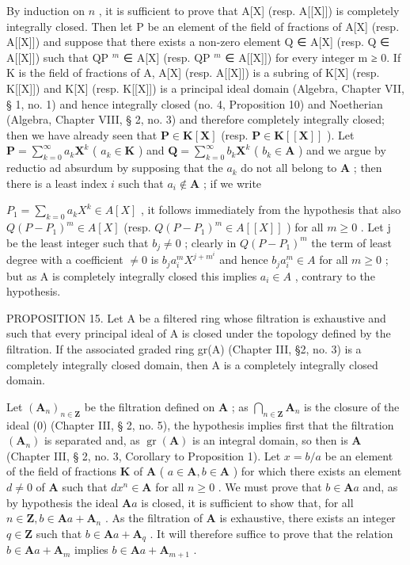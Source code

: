 By induction on \(n\) , it is sufficient to prove that A{[}X{]} (resp. A{[}{[}X{]}{]}) is completely integrally closed. Then let P be an element of the field of fractions of A{[}X{]} (resp. A{[}{[}X{]}{]}) and suppose that there exists a non-zero element Q ∈ A{[}X{]} (resp. Q ∈ A{[}{[}X{]}{]}) such that QP \(^{m}\) ∈ A{[}X{]} (resp. QP \(^{m}\) ∈ A{[}{[}X{]}{]}) for every integer m ≥ 0. If K is the field of fractions of A, A{[}X{]} (resp. A{[}{[}X{]}{]}) is a subring of K{[}X{]} (resp. K{[}{[}X{]}{]}) and K{[}X{]} (resp. K{[}{[}X{]}{]}) is a principal ideal domain (Algebra, Chapter VII, § 1, no. 1) and hence integrally closed (no. 4, Proposition 10) and Noetherian (Algebra, Chapter VIII, § 2, no. 3) and therefore completely integrally closed; then we have already seen that \(\mathbf{P} \in \mathbf{K}[\mathbf{X}]\) (resp. \(\mathbf{P} \in \mathbf{K}[[\mathbf{X}]]\) ). Let \(\mathbf{P} = \sum_{k=0}^{\infty} a_k \mathbf{X}^k\) ( \(a_k \in \mathbf{K}\) ) and \(\mathbf{Q} = \sum_{k=0}^{\infty} b_k \mathbf{X}^k\) ( \(b_k \in \mathbf{A}\) ) and we argue by reductio ad absurdum by supposing that the \(a_k\) do not all belong to \(\mathbf{A}\) ; then there is a least index \(i\) such that \(a_i \notin \mathbf{A}\) ; if we write

\(P_{1}=\sum_{k=0}a_{k}X^{k}\in A[X]\) , it follows immediately from the hypothesis that also \(Q(P-P_{1})^{m}\in A[X]\) (resp. \(Q(P-P_{1})^{m}\in A[[X]]\) ) for all \(m\geqslant0\) . Let j be the least integer such that \(b_{j}\neq0\) ; clearly in \(Q(P-P_{1})^{m}\) the term of least degree with a coefficient \(\neq0\) is \(b_{j}a_{i}^{m}X^{j+m^{i}}\) and hence \(b_{j}a_{i}^{m}\in A\) for all \(m\geqslant0\) ; but as A is completely integrally closed this implies \(a_{i}\in A\) , contrary to the hypothesis.

PROPOSITION 15. Let A be a filtered ring whose filtration is exhaustive and such that every principal ideal of A is closed under the topology defined by the filtration. If the associated graded ring gr(A) (Chapter III, §2, no. 3) is a completely integrally closed domain, then A is a completely integrally closed domain.

Let \((\mathbf{A}_n)_{n\in \mathbf{Z}}\) be the filtration defined on \(\mathbf{A}\) ; as \(\bigcap_{n\in \mathbf{Z}}\mathbf{A}_n\) is the closure of the ideal (0) (Chapter III, § 2, no. 5), the hypothesis implies first that the filtration \((\mathbf{A}_n)\) is separated and, as \(\operatorname{gr}(\mathbf{A})\) is an integral domain, so then is \(\mathbf{A}\) (Chapter III, § 2, no. 3, Corollary to Proposition 1). Let \(x = b / a\) be an element of the field of fractions \(\mathbf{K}\) of \(\mathbf{A}\) ( \(a\in \mathbf{A}, b\in \mathbf{A}\) ) for which there exists an element \(d\neq 0\) of \(\mathbf{A}\) such that \(dx^n\in \mathbf{A}\) for all \(n\geqslant 0\) . We must prove that \(b\in \mathbf{A}a\) and, as by hypothesis the ideal \(\mathbf{A}a\) is closed, it is sufficient to show that, for all \(n\in \mathbf{Z}, b\in \mathbf{A}a + \mathbf{A}_n\) . As the filtration of \(\mathbf{A}\) is exhaustive, there exists an integer \(q\in \mathbf{Z}\) such that \(b\in \mathbf{A}a + \mathbf{A}_q\) . It will therefore suffice to prove that the relation \(b\in \mathbf{A}a + \mathbf{A}_m\) implies \(b\in \mathbf{A}a + \mathbf{A}_{m + 1}\) .

